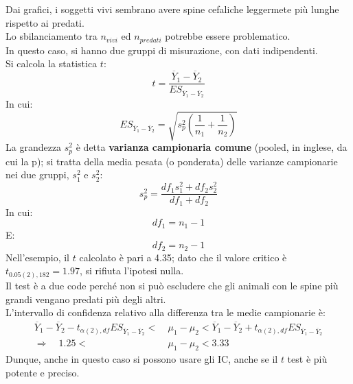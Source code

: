 \documentclass[10pt, draft]{book}
\newcounter{example}[section]
\begin{document}
\begin{example}
\begin{figure}[H]
        \caption{\small{}}
    \end{figure}
    Dai grafici, i soggetti vivi sembrano avere spine cefaliche leggermete più lunghe rispetto ai predati.
    \\
    Lo sbilanciamento tra $n_{vivi}$ ed $n_{predati}$ potrebbe essere problematico.
    \\
    In questo caso, si hanno due gruppi di misurazione, con dati indipendenti.
    \\
    Si calcola la statistica $t$:
    \begin{equation}
        t = \frac{\overline{Y}_1-\overline{Y}_2}{ES_{\overline{Y}_1-\overline{Y}_2}}
    \end{equation}
    In cui:
    \begin{equation}
        ES_{\overline{Y}_1-\overline{Y}_2} = \sqrt{s_p^2(\frac{1}{n_1}+\frac{1}{n_2})}
    \end{equation}
    La grandezza $s_p^2$ è detta \textbf{varianza campionaria comune} (pooled, in inglese, da cui la p); si tratta della media pesata (o ponderata) delle varianze campionarie nei due gruppi, $s_1^2$ e $s_2^2$:
    \begin{equation}
        s_p^2 = \frac{df_1 s_1^2+df_2 s_2^2}{df_1+df_2}
    \end{equation}
    In cui:
    \begin{equation}
        df_1 = n_1-1
    \end{equation}
    E:
    \begin{equation}
        df_2 = n_2-1
    \end{equation}
    Nell'esempio, il $t$ calcolato è pari a 4.35; dato che il valore critico è $t_{0.05(2),182} = 1.97$, si rifiuta l'ipotesi nulla.
    \\
    Il test è a due code perché non si può escludere che gli animali con le spine più grandi vengano predati più degli altri.
    \\
    L'intervallo di confidenza relativo alla differenza tra le medie campionarie è:
    \begin{align*}
        \overline{Y}_1-\overline{Y}_2-t_{\alpha(2),df}ES_{\overline{Y}_1-\overline{Y}_2}<\ &\mu_1-\mu_2<\overline{Y}_1-\overline{Y}_2+t_{\alpha(2),df}ES_{\overline{Y}_1-\overline{Y}_2}
        \\
        \Rightarrow \quad 1.25<\ &\mu_1-\mu_2<3.33
    \end{align*}
    Dunque, anche in questo caso si possono usare gli IC, anche se il $t$ test è più potente e preciso.
\end{example}
\end{document}
